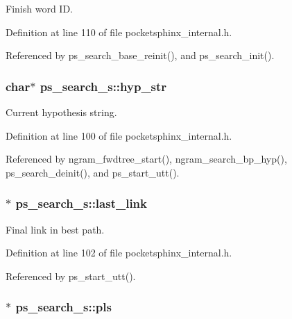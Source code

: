 Finish word I\+D. 



Definition at line 110 of file pocketsphinx\+\_\+internal.\+h.



Referenced by ps\+\_\+search\+\_\+base\+\_\+reinit(), and ps\+\_\+search\+\_\+init().

\subsubsection[{hyp\+\_\+str}]{\setlength{\rightskip}{0pt plus 5cm}char$\ast$ ps\+\_\+search\+\_\+s\+::hyp\+\_\+str}\label{structps__search__s_aa398c736a887af97e42b2a562359adc3}


Current hypothesis string. 



Definition at line 100 of file pocketsphinx\+\_\+internal.\+h.



Referenced by ngram\+\_\+fwdtree\+\_\+start(), ngram\+\_\+search\+\_\+bp\+\_\+hyp(), ps\+\_\+search\+\_\+deinit(), and ps\+\_\+start\+\_\+utt().

\subsubsection[{last\+\_\+link}]{$\ast$ ps\+\_\+search\+\_\+s\+::last\+\_\+link}\label{structps__search__s_aa3020ef7bd4e56713dfe2fbad52e6e4f}


Final link in best path. 



Definition at line 102 of file pocketsphinx\+\_\+internal.\+h.



Referenced by ps\+\_\+start\+\_\+utt().

\subsubsection[{pls}]{$\ast$ ps\+\_\+search\+\_\+s\+::pls}\label{structps__search__s_a2a33b7698fb237b42e007788f65cd46c}


